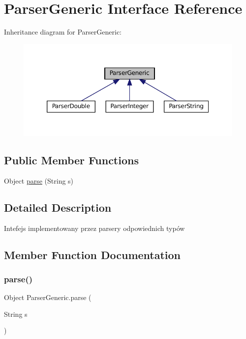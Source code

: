 \hypertarget{interfaceParserGeneric}{}\section{Parser\+Generic Interface Reference}
\label{interfaceParserGeneric}


Inheritance diagram for Parser\+Generic\+:
\nopagebreak
\begin{figure}[H]
\begin{center}
\leavevmode
\includegraphics[width=350pt]{interfaceParserGeneric__inherit__graph}
\end{center}
\end{figure}
\subsection*{Public Member Functions}
\begin{DoxyCompactItemize}
\item 
Object \hyperlink{interfaceParserGeneric_a42d671b89e41a5adb31a41c59db57503}{parse} (String s)
\end{DoxyCompactItemize}


\subsection{Detailed Description}
Intefejs implementowany przez parsery odpowiednich typów 

\subsection{Member Function Documentation}
\mbox{\label{interfaceParserGeneric_a42d671b89e41a5adb31a41c59db57503}} 
\subsubsection{\texorpdfstring{parse()}{parse()}}
{\footnotesize\ttfamily Object Parser\+Generic.\+parse (\begin{DoxyParamCaption}\item[{String}]{s }\end{DoxyParamCaption})}




